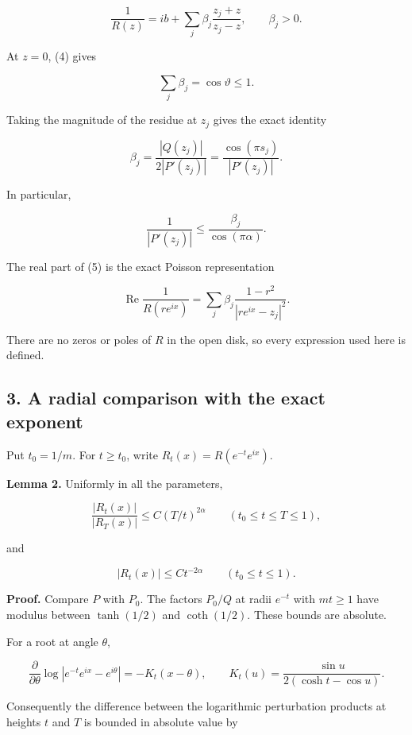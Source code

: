 \documentclass[10pt,a4paper]{article}
\begin{document}
\nopagebreak[4]
\[\frac1{R(z)}=ib+\sum_j\beta_j\frac{z_j+z}{z_j-z},\qquad \beta_j>0. \tag{5}\]

At \(z=0\), (4) gives

\nopagebreak[4]
\[\sum_j\beta_j=\cos\vartheta\le1. \tag{6}\]

Taking the magnitude of the residue at \(z_j\) gives the exact identity

\nopagebreak[4]
\[\beta_j=\frac{|Q(z_j)|}{2|P'(z_j)|}
       =\frac{\cos(\pi s_j)}{|P'(z_j)|}. \tag{7}\]

In particular,

\nopagebreak[4]
\[\frac1{|P'(z_j)|}\le\frac{\beta_j}{\cos(\pi\alpha)}. \tag{8}\]

The real part of (5) is the exact Poisson representation

\nopagebreak[4]
\[\operatorname{Re}\frac1{R(re^{ix})}
 =\sum_j\beta_j\frac{1-r^2}{|re^{ix}-z_j|^2}. \tag{9}\]

There are no zeros or poles of \(R\) in the open disk, so every
expression used here is defined.

\subsection{3. A radial comparison with the exact
exponent}\label{a-radial-comparison-with-the-exact-exponent}

Put \(t_0=1/m\). For \(t\ge t_0\), write \(R_t(x)=R(e^{-t}e^{ix})\).

\textbf{Lemma 2.} Uniformly in all the parameters,

\nopagebreak[4]
\[\frac{|R_t(x)|}{|R_T(x)|}\le C(T/t)^{2\alpha}
       \qquad(t_0\le t\le T\le1), \tag{10}\]

and

\nopagebreak[4]
\[|R_t(x)|\le C t^{-2\alpha}\qquad(t_0\le t\le1). \tag{11}\]

\textbf{Proof.} Compare \(P\) with \(P_0\). The factors \(P_0/Q\) at
radii \(e^{-t}\) with \(mt\ge1\) have modulus between \(\tanh(1/2)\) and
\(\coth(1/2)\). These bounds are absolute.

For a root at angle \(\theta\),

\nopagebreak[4]
\[\frac{\partial}{\partial\theta}\log|e^{-t}e^{ix}-e^{i\theta}|
 =-K_t(x-\theta),\qquad
 K_t(u)=\frac{\sin u}{2(\cosh t-\cos u)}. \tag{12}\]

Consequently the difference between the logarithmic perturbation
products at heights \(t\) and \(T\) is bounded in absolute value by
\end{document}
